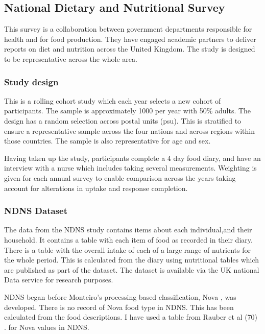 \documentclass[
]{article}
\begin{document}
\hypertarget{national-dietary-and-nutritional-survey}{%
\subsection{National Dietary and Nutritional
Survey}\label{national-dietary-and-nutritional-survey}}

This survey is a collaboration between government departments
responsible for health and for food production. They have engaged
academic partners to deliver reports on diet and nutrition across the
United Kingdom. The study is designed to be representative across the
whole area.

\hypertarget{study-design}{%
\subsubsection{Study design}\label{study-design}}

This is a rolling cohort study which each year selects a new cohort of
participants. The sample is approximately 1000 per year with 50\%
adults. The design has a random selection across postal units (psu).
This is stratified to ensure a representative sample across the four
nations and across regions within those countries. The sample is also
representative for age and sex.

Having taken up the study, participants complete a 4 day food diary, and
have an interview with a nurse which includes taking several
measurements. Weighting is given for each annual survey to enable
comparison across the years taking account for alterations in uptake and
response completion.

\hypertarget{ndns-dataset}{%
\subsubsection{NDNS Dataset}\label{ndns-dataset}}

The data from the NDNS study contains items about each individual,and
their household. It contains a table with each item of food as recorded
in their diary. There is a table with the overall intake of each of a
large range of nutrients for the whole period. This is calculated from
the diary using nutritional tables which are published as part of the
dataset. The dataset is available via the UK national Data service for
research purposes.

NDNS began before Monteiro's processing based classification, Nova , was
developed. There is no record of Nova food type in NDNS. This has been
calculated from the food descriptions. I have used a table from Rauber
et al (70) . for Nova values in NDNS.
\end{document}
